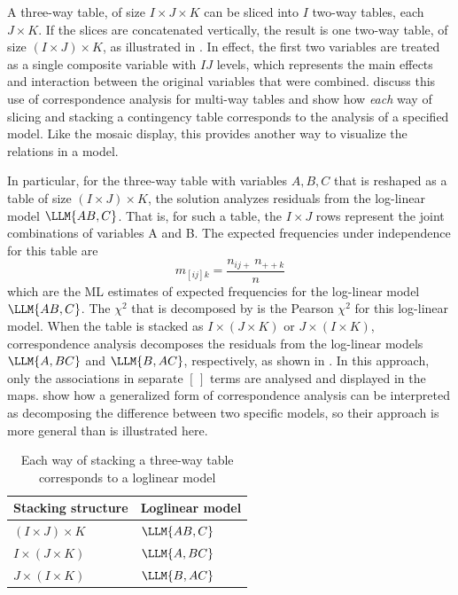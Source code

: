 \documentclass[11pt]{book}
\begin{document}
A
three-way table, of size \(I \times  J \times  K\) can be sliced into
\(I\) two-way tables, each \(J \times  K\).  If the slices are
concatenated vertically, the result is one two-way table, of size \((
I \times  J ) \times  K\), as illustrated in .
In effect, the first two variables are
treated as a single composite variable with \(IJ\) levels, which represents the main
effects and interaction between the original variables that were
combined.
discuss this use of
correspondence analysis for multi-way tables and show how \emph{each} way of
slicing and stacking a contingency table corresponds to the analysis
of a specified \loglin model.
Like the mosaic display, this provides another way to visualize the relations
in a \loglin model.

In particular, for the three-way table with variables $A, B, C$
that is reshaped as a table of
size \(( I \times  J ) \times  K\), the \ca
solution analyzes residuals from the log-linear model 
$\LLM{AB,C}$.
That
is, for such a table, the \(I \times  J\) rows represent the joint
combinations of variables A and B.  The expected frequencies under
independence for this table are
\begin{equation}\label{eq:mij-k}
  m_{[ij]k} 
  = \frac{ n_{ij+} \,  n_{++k} }{n}
\end{equation}
which are the ML estimates of expected frequencies for the log-linear
model $\LLM{AB, C}$.  
The \(\chi^2\) that is decomposed by \ca is the Pearson
\(\chi^2\) for this log-linear model.  When the table is stacked as
\(I \times  ( J \times  K )\) or \(J \times  ( I \times  K )\),
correspondence analysis decomposes the residuals from the log-linear
models $\LLM{A,BC}$ and $\LLM{B,AC}$, respectively, as shown in 
.
In this approach, only the associations in separate $[ \, ]$ terms are analysed
and displayed in the \ca maps.
show how a generalized form of correspondence analysis
can be interpreted as decomposing the difference between two specific
\loglin models, so their approach is more general than is illustrated
here.

\begin{table}[htb]
  \centering
  \caption{Each way of stacking a three-way table corresponds to a loglinear model}\label{tab:stacking}
  \vspace{1ex}
  \begin{tabular}{ll}
   \hline
   Stacking structure & Loglinear model \\ [.5ex]
   \hline
   \(( I \times  J ) \times  K\) & $\LLM{AB,C}$ \\
   \(I \times  ( J \times  K )\) & $\LLM{A,BC}$ \\
   \(J \times  ( I \times  K )\) & $\LLM{B,AC}$ \\
   \hline
  \end{tabular}
\end{table}
\end{document}
